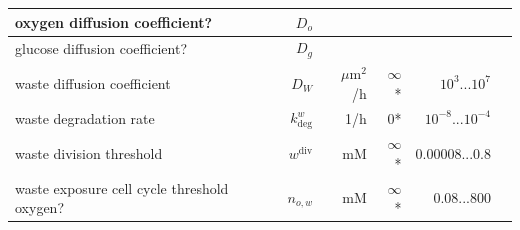 \documentclass[10pt,letterpaper]{article}
\begin{document}
\begin{table}[!ht]
\begin{adjustwidth}{-1in}{0in}
\begin{tabular}{|l|r|r|r|r|r|}
{\color{green}oxygen diffusion coefficient?} 			&$D_o$&  &  &  \\ \hline
{\color{green}glucose diffusion coefficient?} 			&$D_g$&  &  &  \\ \hline
waste diffusion coefficient 			&$D_W$& $\mu$m$^{2}$/h&$\infty$*& $10^{3}...10^{7}$\\ \hline
waste degradation rate					& $k^w_{\text{deg}}$ &1/h &$0$*& $10^{-8}...10^{-4}$\\ \hline
waste division threshold 			&$w^{\text{div}}$ &{\color{green}mM} &$\infty$*&0.00008...0.8\\ \hline
waste exposure cell cycle threshold {\color{green}oxygen?} 	&$n_{o,w}$&{\color{green}mM}& $\infty$*& 0.08...800\\ \hline
\end{tabular}
\label{tab:model-parameters}
\end{adjustwidth}
\end{table}
\end{document}
